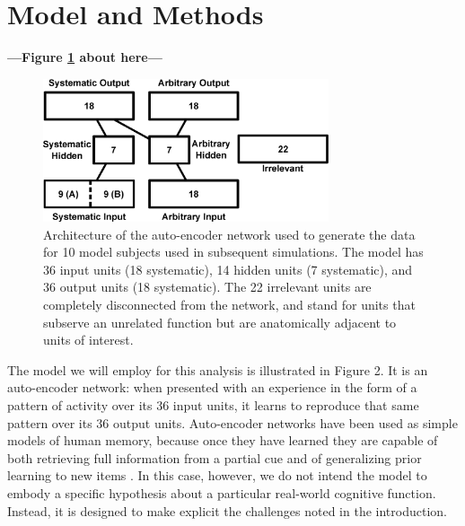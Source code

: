 \section{Model and Methods}

\begin{center}
\textbf{---Figure \ref{fig.model_outline} about here---}
\end{center}

\begin{figure}
\centering
\includegraphics[width=0.75\textwidth]{figures/figure2.eps}
\caption{\label{fig.model_outline} Architecture of the auto-encoder network used to generate the data for 10 model subjects used in subsequent simulations. The model has 36 input units (18 systematic), 14 hidden units (7 systematic), and 36 output units (18 systematic). The 22 irrelevant units are completely disconnected from the network, and stand for units that subserve an unrelated function but are anatomically adjacent to units of interest.}
\end{figure}

The model we will employ for this analysis is illustrated in Figure 2. It is an auto-encoder network: when presented with an experience in the form of a pattern of activity over its 36 input units, it learns to reproduce that same pattern over its 36 output units. Auto-encoder networks have been used as simple models of human memory, because once they have learned they are capable of both retrieving full information from a partial cue and of generalizing prior learning to new items \cite{McClellandRumelhart85}. In this case, however, we do not intend the model to embody a specific hypothesis about a particular real-world cognitive function. Instead, it is designed to make explicit the challenges noted in the introduction. 

